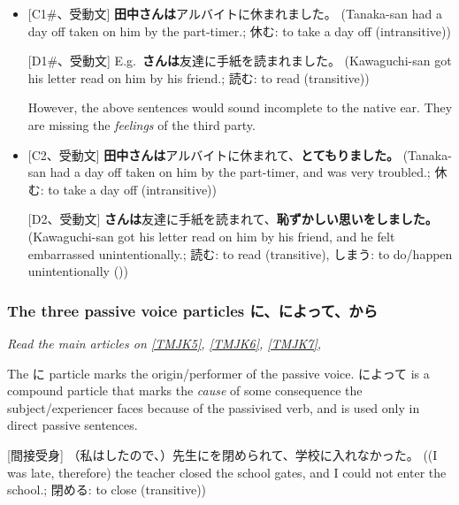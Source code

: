 \documentclass[../nihongo-gakushuu-kyouzai.tex]{subfiles}
\begin{document}
\begin{itemize}
    \item{} [C1\#、受動文] \textbf{田中さんは}アルバイトに休まれました。 (Tanaka-san had a day off taken on him by the part-timer.; 休む: to take a day off (intransitive))

    [D1\#、受動文] E.g.\ \textbf{さんは}友達に手紙を読まれました。 (Kawaguchi-san got his letter read on him by his friend.; 読む: to read (transitive))

    However, the above sentences would sound incomplete to the native ear. They are missing the \emph{feelings} of the third party.

    \item{} [C2、受動文] \textbf{田中さんは}アルバイトに休まれて、\textbf{とてもりました。} (Tanaka-san had a day off taken on him by the part-timer, and was very troubled.; 休む: to take a day off (intransitive))

    [D2、受動文] \textbf{さんは}友達に手紙を読まれて、\textbf{恥ずかしい思いをしました。} (Kawaguchi-san got his letter read on him by his friend, and he felt embarrassed unintentionally.; 読む: to read (transitive), しまう: to do/happen unintentionally (\aux))

\end{itemize}




\subsubsection{The three passive voice particles に、によって、から} \label{sec:tmjk-5-6-7-passive-voice-particles}
\emph{Read the main articles on \href{https://www.tomojuku.com/blog/passive/passive-11/}{[TMJK5]}, \href{https://www.tomojuku.com/blog/passive/passive-12/}{[TMJK6]}, \href{https://www.tomojuku.com/blog/passive/passive-10/}{[TMJK7]},}

The に particle marks the origin/performer of the passive voice. によって is a compound particle that marks the \emph{cause} of some consequence the subject/experiencer faces because of the passivised verb, and is used only in direct passive sentences. 

[間接受身] （私はしたので、）先生にを閉められて、学校に入れなかった。 ((I was late, therefore) the teacher closed the school gates, and I could not enter the school.; 閉める: to close (transitive))
\end{document}
